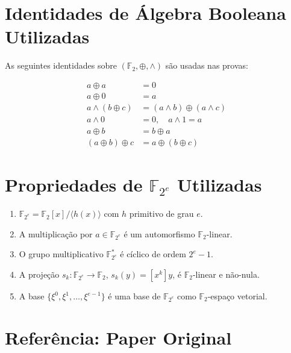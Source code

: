 \documentclass[12pt,a4paper]{article}
\theoremstyle{definition}
\theoremstyle{remark}
\newcommand{\GF}[1]{\mathbb{F}_{2^{#1}}}
\newcommand{\GFtwo}{\mathbb{F}_2}
\newcommand{\xor}{\oplus}
\newcommand{\AND}{\wedge}
\begin{document}
\appendix

\section{Identidades de Álgebra Booleana Utilizadas}
\label{app:boolean}

As seguintes identidades sobre $(\GFtwo, \xor, \AND)$ são usadas nas provas:

\begin{align*}
  a \xor a &= 0 \tag{A1: Complemento} \\
  a \xor 0 &= a \tag{A2: Identidade XOR} \\
  a \AND (b \xor c) &= (a \AND b) \xor (a \AND c) \tag{A3: Distributividade} \\
  a \AND 0 &= 0, \quad a \AND 1 = a \tag{A4: Absorção} \\
  a \xor b &= b \xor a \tag{A5: Comutatividade} \\
  (a \xor b) \xor c &= a \xor (b \xor c) \tag{A6: Associatividade}
\end{align*}

\section{Propriedades de $\GF{e}$ Utilizadas}
\label{app:gf2e}

\begin{enumerate}[label=(GF\arabic*)]
  \item $\GF{e} = \GFtwo[x]/\langle h(x) \rangle$ com $h$ primitivo de grau $e$.
  \item A multiplicação por $a \in \GF{e}$ é um automorfismo $\GFtwo$-linear.
  \item O grupo multiplicativo $\GF{e}^*$ é cíclico de ordem $2^e - 1$.
  \item A projeção $s_k : \GF{e} \to \GFtwo$, $s_k(y) = [x^k] y$, é
        $\GFtwo$-linear e não-nula.
  \item A base $\{\xi^0, \xi^1, \ldots, \xi^{e-1}\}$ é uma base de $\GF{e}$
        como $\GFtwo$-espaço vetorial.
\end{enumerate}

\section{Referência: Paper Original}
\label{app:paper}
\end{document}
